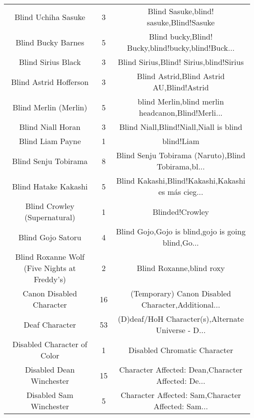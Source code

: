 \begin{table}[h!]
{\begin{tabular}{|c|c|c|}
                               Blind Uchiha Sasuke &      3 &            Blind Sasuke,blind! sasuke,Blind!Sasuke \\
                                Blind Bucky Barnes &      5 & Blind bucky,Blind! Bucky,blind!bucky,blind!Buck... \\
                                Blind Sirius Black &      3 &            Blind Sirius,Blind! Sirius,blind!Sirius \\
                            Blind Astrid Hofferson &      3 &          Blind Astrid,Blind Astrid AU,Blind!Astrid \\
                             Blind Merlin (Merlin) &      5 & blind Merlin,blind merlin headcanon,Blind!Merli... \\
                                 Blind Niall Horan &      3 &             Blind Niall,Blind!Niall,Niall is blind \\
                                  Blind Liam Payne &      1 &                                         blind!Liam \\
                              Blind Senju Tobirama &      8 & Blind Senju Tobirama (Naruto),Blind Tobirama,bl... \\
                              Blind Hatake Kakashi &      5 & Blind Kakashi,Blind!Kakashi,Kakashi es más cieg... \\
                      Blind Crowley (Supernatural) &      1 &                                    Blinded!Crowley \\
                                 Blind Gojo Satoru &      4 & Blind Gojo,Gojo is blind,gojo is going blind,Go... \\
      Blind Roxanne Wolf (Five Nights at Freddy's) &      2 &                           Blind Roxanne,blind roxy \\
                          Canon Disabled Character &     16 & (Temporary) Canon Disabled Character,Additional... \\
                                    Deaf Character &     53 & (D)deaf/HoH Character(s),Alternate Universe - D... \\
                       Disabled Character of Color &      1 &                       Disabled Chromatic Character \\
                          Disabled Dean Winchester &     15 & Character Affected: Dean,Character Affected: De... \\
                           Disabled Sam Winchester &      5 & Character Affected: Sam,Character Affected: Sam... \\

\end{tabular}}
\end{table}
